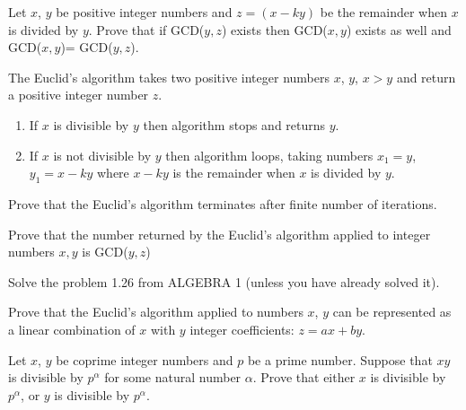 \documentclass[12pt]{article}
\begin{document}

\begin{zadacha} Let $x$, $y$ be positive integer numbers and $z= (x -
  ky)$ be the remainder when $x$ is divided by $y$. Prove that if 
GCD($y,z$) exists then GCD($x,y$) exists as well and GCD($x,y$)=
GCD($y,z$).
\end{zadacha}

\begin{opredelenie} 
The Euclid's algorithm takes two positive integer numbers $x$, $y$,
$x>y$ and return a positive integer number $z$.
\begin{enumerate}
\item If $x$ is divisible by $y$ then algorithm stops and returns $y$.
\item If $x$ is not divisible by $y$ then algorithm loops, taking
 numbers $x_1 = y$, $y_1= x - ky$ where $x - ky$ is the remainder when
 $x$ is divided by $y$.
\end{enumerate}
\end{opredelenie}

\begin{zadacha} Prove that the Euclid's algorithm terminates after
 finite number of iterations.
\end{zadacha}

\begin{zadacha} Prove that the number returned by the Euclid's
  algorithm applied to integer numbers $x,y$ is GCD($y,z$) 
\end{zadacha}

\begin{zadacha}
Solve the problem 1.26 from ALGEBRA 1 (unless you have already solved
it).
\end{zadacha}

\begin{zadacha} Prove that the Euclid's algorithm applied to numbers
  $x$, $y$ can be represented as a linear combination of  $x$ with $y$
  integer coefficients: $z = ax + by$.
\end{zadacha}

\begin{zadacha} Let $x$, $y$ be coprime integer numbers and $p$
  be a prime number. Suppose that $xy$ is divisible by $p^\alpha$ for
  some natural number $\alpha$. Prove that either $x$ is divisible by
  $p^\alpha$, or $y$ is divisible by $p^\alpha$.
\end{zadacha}
\end{document}

